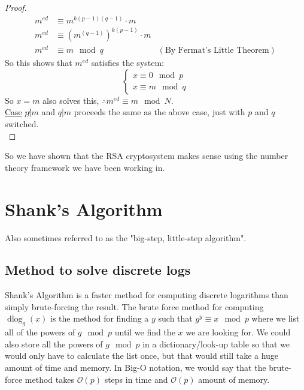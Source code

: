 \documentclass[10pt]{article}
\theoremstyle{definition}
\theoremstyle{remark}
\def\ul{\underline}
\DeclareMathOperator{\dlog}{dlog}
\newcommand{\bigoh}{\mathcal{O}}
\begin{document}
\begin{proof}
\begin{align*}
m^{ed} & \equiv m^{k(p-1)(q-1)} \cdot m \\
m^{ed} & \equiv (m^{(q-1)})^{k(p-1)} \cdot m \\
m^{ed} & \equiv m \mod q &(\text{By Fermat's Little Theorem})
\end{align*}
So this shows that $m^{ed}$ satisfies the system: 
$$\begin{cases}
x \equiv 0 \mod p\\
x \equiv m \mod q
\end{cases}$$
So $x = m$ also solves this, $\therefore m^{ed} \equiv m \mod N$.\\
\ul{Case} $p \not |m$ and $q|m$ proceeds the same as the above case, just with $p$ and $q$ switched.\\
\end{proof}
So we have shown that the RSA cryptosystem makes sense using the number theory framework we have been working in.
\section{Shank's Algorithm}
Also sometimes referred to as the "big-step, little-step algorithm".
\subsection{Method to solve discrete logs}
Shank's Algorithm is a faster method for computing discrete logarithms than simply brute-forcing the result.  The brute force method for computing $\dlog_g(x)$ is the method for finding a $y$ such that $g^y \equiv x \mod p$ where we list all of the powers of $g \mod p$ until we find the $x$ we are looking for.  We could also store all the powers of $g \mod p$ in a dictionary/look-up table so that we would only have to calculate the list once, but that would still take a huge amount of time and memory.  In Big-O notation, we would say that the brute-force method takes $\bigoh(p)$ steps in time and $\bigoh(p)$ amount of memory.
\end{document}
